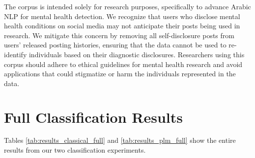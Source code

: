 \documentclass[11pt]{article}
\begin{document}
The corpus is intended solely for research purposes, specifically to advance Arabic NLP for mental health detection. We recognize that users who disclose mental health conditions on social media may not anticipate their posts being used in research. We mitigate this concern by removing all self-disclosure posts from users' released posting histories, ensuring that the data cannot be used to re-identify individuals based on their diagnostic disclosures. Researchers using this corpus should adhere to ethical guidelines for mental health research and avoid applications that could stigmatize or harm the individuals represented in the data.


%


\appendix

\section{Full Classification Results}
Tables \ref{tab:results_classical_full} and \ref{tab:results_plm_full} show the entire results from our two classification experiments.

\label{app:full_results}



\end{document}
